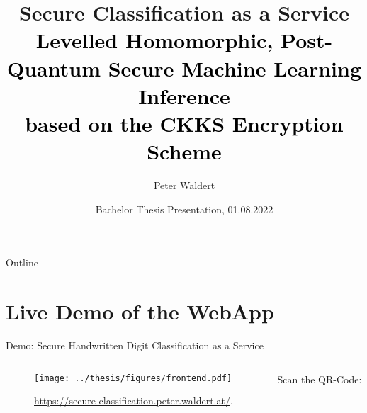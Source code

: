 \documentclass[aspectratio=169, onlytextwidth]{beamer}
\title[Secure Classification as a Service]{
  Secure Classification as a Service \\
  \small\normalfont\textcolor{black}{
    Levelled Homomorphic, Post-Quantum Secure Machine Learning Inference \\
    based on the CKKS Encryption Scheme
  }
}
\author{Peter Waldert}
\date{Bachelor Thesis Presentation, 01.08.2022}
\institute{IAIK}
\begin{document}
  \begin{frame}[plain]
    \maketitle
  \end{frame}

  \begin{frame}{Outline}
    \tableofcontents
  \end{frame}

  
  
  
  

  \section{Live Demo of the WebApp}
  \begin{frame}{Demo: Secure Handwritten Digit Classification as a Service}
    \begin{columns}[c]
      \begin{column}{0.7\linewidth}
        \begin{figure}[H]
          \centering
          \texttt{[image: ../thesis/figures/frontend.pdf]}
          \vspace{-0.3cm}
          \caption{\url{https://secure-classification.peter.waldert.at/}.}
        \end{figure}
      \end{column}
      \begin{column}{0.24\linewidth}
        Scan the QR-Code:
      \end{column}
    \end{columns}
  \end{frame}

  
\end{document}

